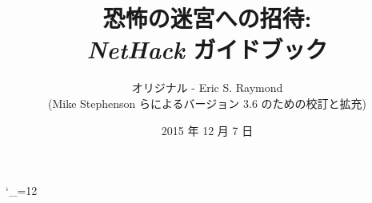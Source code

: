 \textheight 220mm
\textwidth 160mm
\oddsidemargin 0mm
\evensidemargin 0mm
\topmargin 0mm

\newcommand{\nd}{\noindent}

\newcommand{\tb}[1]{\tt #1 \hfill}
\newcommand{\bb}[1]{\bf #1 \hfill}
\newcommand{\ib}[1]{\it #1 \hfill}

\newcommand{\blist}[1]
{\begin{list}{$\bullet$}
    {\leftmargin 30mm \topsep 2mm \partopsep 0mm \parsep 0mm \itemsep 1mm
     \labelwidth 28mm \labelsep 2mm
     #1}}

\newcommand{\elist}{\end{list}}

\catcode`\_=12



%
%
\title{\LARGE 恐怖の迷宮への招待:\\
\Large {\it NetHack\/} ガイドブック}

\author{オリジナル - Eric S. Raymond\\
(Mike Stephenson らによるバージョン 3.6 のための校訂と拡充)}
\date{2015 年 12 月 7 日}

